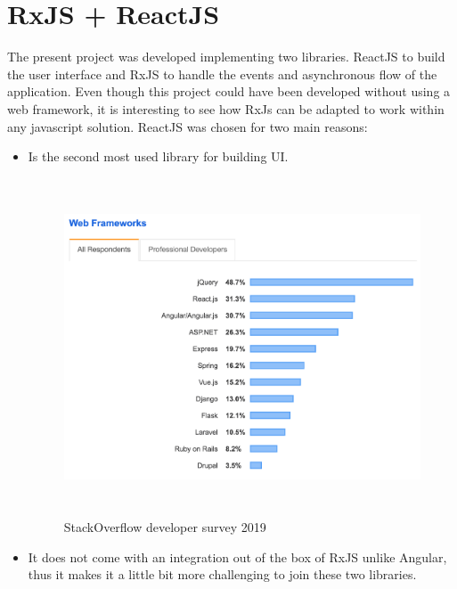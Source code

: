 \documentclass[12pt]{report}
\begin{document}
\section{RxJS + ReactJS}
The present project was developed implementing two libraries. ReactJS to build the user interface and RxJS to handle the events and asynchronous flow of the application. Even though this project could have been developed without using a web framework, it is interesting to see how RxJs can be adapted to work within any javascript solution. ReactJS was chosen for two main reasons:
\begin{itemize}
\item Is the second most used library for building UI.
\begin{figure}[h]
\centering
\includegraphics[width=12cm, height=10cm]{react_survey.png}
\caption{StackOverflow developer survey 2019}
\label{fig:stack_react}
\end{figure}
\item It does not come with an integration out of the box of RxJS unlike Angular, thus it makes it a little bit more challenging to join these two libraries.
\end{itemize}

\end{document}
